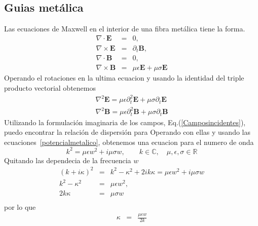 \subsection{Guias metálica}
Las ecuaciones de Maxwell en el interior de una fibra metálica tiene la forma.
\begin{subequations} \label{mawxellmetalicas}
	\begin{eqnarray}
	\nabla \cdot \mathbf{E} &=& 0 ,\\
	\nabla \times \mathbf{E} &=& \partial_{t}\mathbf{B}, \\
	\nabla \cdot \mathbf{B} &=& 0, \\ 
	\nabla \times \mathbf{B} &=& \mu \epsilon \mathbf{E} + \mu \sigma \mathbf{E}  
	\end{eqnarray}
\end{subequations}
Operando el rotaciones en la ultima ecuacion y usando la identidad del triple producto vectorial obtenemos
\begin{subequations}\label{potencialmetalico}
	\begin{align}
	\nabla^2 \mathbf{E}=\mu \epsilon \partial_{t}^2\mathbf{E}+\mu\sigma \partial_{t} \mathbf{E} \\
	\nabla^2 \mathbf{B}=\mu \epsilon \partial_{t}^2\mathbf{B}+\mu\sigma \partial_{t} \mathbf{B} 
	\end{align}
\end{subequations}
Utilizando la formulación imaginaria de los campos, Eq.(\ref{Camposincidentes}), puedo encontrar la relación de dispersión para 
Operando con ellas y usando las ecuaciones~\ref{potencialmetalico}, obtenemos una ecuacion para
el numero de onda
\begin{equation}
k^2=\mu \epsilon w^2 + i \mu \sigma w, \qquad k \in \mathbb{C}, \quad \mu, \epsilon, \sigma \in \mathbb{R}
\end{equation}
Quitando las dependecia de la frecuencia $w$ 
\begin{subequations}
	\begin{eqnarray}
	(k+i\kappa)^2 &=& k^2-\kappa^2+2ik\kappa=\mu\epsilon w^2+i\mu\sigma w \nonumber \\
	k^2 - \kappa^2 &=& \mu \epsilon w^2, \\ 
	2 k \kappa &=& \mu \sigma w \nonumber \\
	\end{eqnarray}
\end{subequations}
por lo que 
\begin{eqnarray}
\kappa &=& \frac{\mu \epsilon w}{2 k}
\end{eqnarray}


